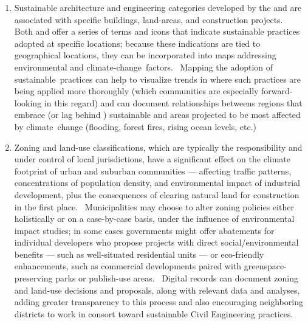 \documentclass[10.5pt]{article}
\begin{document}
{{\begin{enumerate}[leftmargin=3pt]
\item{} Sustainable architecture and engineering categories developed by the \WRI{} and \ISI{} are associated with specific buildings, land-areas, and construction projects.  Both \WRI{} and \ISI{} offer a series of terms and icons that indicate sustainable practices adopted at specific locations; because these indications are tied to geographical locations, they can be incorporated into \GIS{} maps addressing environmental and climate-change factors.  Mapping the adoption of sustainable practices can help to visualize trends in where such practices are being applied more thoroughly (which communities are especially forward-looking in this regard) and can document relationships betweens regions that embrace (or lag behind \visavis{}) sustainable \AEC{} and areas projected to be most affected by climate change (flooding, forest fires, rising ocean levels, etc.)
 

\item{} Zoning and land-use classifications, which are typically the responsibility and under control of local jurisdictions, have a significant effect on the climate footprint of urban and suburban communities --- affecting traffic patterns, concentrations of population density, and environmental impact of industrial development, plus the consequences of clearing natural land for construction in the first place.  Municipalities may choose to alter zoning policies either holistically or on a case-by-case basis, under the influence of environmental impact studies; in some cases governments might offer abatements for individual developers who propose projects with direct social/environmental benefits --- such as well-situated residential units --- or eco-friendly enhancements, such as commercial developments paired with greenspace-preserving parks or publish-use areas.  Digital records can document zoning and land-use decisions and proposals, along with relevant data and analyses, adding greater transparency to this process and also encouraging neighboring districts to work in consort toward sustainable Civil Engineering practices. 


\end{enumerate}}}
\end{document}
